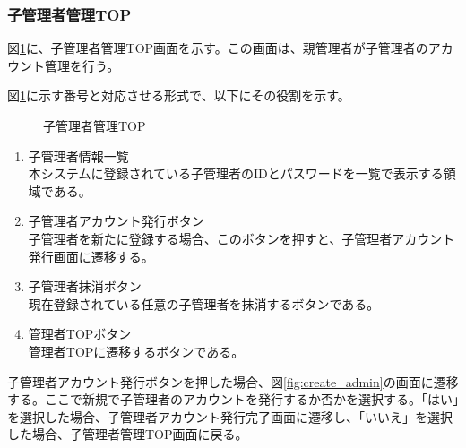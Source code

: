 \documentclass[a4j]{jarticle}
\begin{document}
\subsubsection{子管理者管理TOP}
図\ref{fig:admin_child_top}に、子管理者管理TOP画面を示す。この画面は、親管理者が子管理者のアカウント管理を行う。

図\ref{fig:admin_child_top}に示す番号と対応させる形式で、以下にその役割を示す。
\begin{figure}[H]
\centering
{}
\caption{子管理者管理TOP}
\label{fig:admin_child_top}
\end{figure}
\begin{enumerate}
  \renewcommand{\labelenumi}{\textcircled{\scriptsize \theenumi}}
  \item 子管理者情報一覧\\
  本システムに登録されている子管理者のIDとパスワードを一覧で表示する領域である。
  \item 子管理者アカウント発行ボタン\\
  子管理者を新たに登録する場合、このボタンを押すと、子管理者アカウント発行画面に遷移する。
  \item 子管理者抹消ボタン\\
  現在登録されている任意の子管理者を抹消するボタンである。
  \item 管理者TOPボタン\\
  管理者TOPに遷移するボタンである。
\end{enumerate}
子管理者アカウント発行ボタンを押した場合、図\ref{fig:create_admin}の画面に遷移する。ここで新規で子管理者のアカウントを発行するか否かを選択する。「はい」を選択した場合、子管理者アカウント発行完了画面に遷移し、「いいえ」を選択した場合、子管理者管理TOP画面に戻る。
\end{document}
